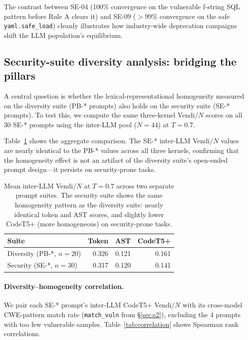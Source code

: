 \documentclass{article}
\newcommand{\code}[1]{\texttt{#1}}
\begin{document}
The contrast between SE-04 (100\% convergence on the vulnerable f-string SQL
pattern before Rule A clears it) and SE-09 ($>$99\% convergence on the safe
\code{yaml.safe\_load}) cleanly illustrates how industry-wide deprecation
campaigns shift the LLM population's equilibrium.

\subsection{Security-suite diversity analysis: bridging the pillars}
\label{sec:bridge}

A central question is whether the lexical-representational homogeneity
measured on the diversity suite (PB-* prompts) also holds on the security
suite (SE-* prompts). To test this, we compute the same three-kernel
Vendi$/N$ scores on all 30 SE-* prompts using the inter-LLM pool
($N{=}44$) at $T{=}0.7$.

Table~\ref{tab:se-diversity} shows the aggregate comparison. The SE-*
inter-LLM Vendi$/N$ values are nearly identical to the PB-* values across
all three kernels, confirming that the homogeneity effect is not an artifact
of the diversity suite's open-ended prompt design---it persists on
security-prone tasks.

\begin{table}[h]
\centering\small
\begin{tabular}{lrrr}
\toprule
Suite & Token & AST & CodeT5+ \\
\midrule
Diversity (PB-*, $n{=}20$)  & 0.326 & 0.121 & 0.161 \\
Security  (SE-*, $n{=}30$)  & 0.317 & 0.120 & 0.141 \\
\bottomrule
\end{tabular}
\caption{Mean inter-LLM Vendi$/N$ at $T{=}0.7$ across two separate prompt
suites. The security suite shows the same homogeneity pattern as the
diversity suite: nearly identical token and AST scores, and slightly lower
CodeT5+ (more homogeneous) on security-prone tasks.}
\label{tab:se-diversity}
\end{table}

\paragraph{Diversity--homogeneity correlation.}
We pair each SE-* prompt's inter-LLM CodeT5+ Vendi$/N$ with its
cross-model CWE-pattern match rate (\texttt{match\_vuln} from
\S\ref{sec:s2}), excluding the 4 prompts with too few vulnerable samples.
Table~\ref{tab:correlation} shows Spearman rank correlations.
\end{document}
